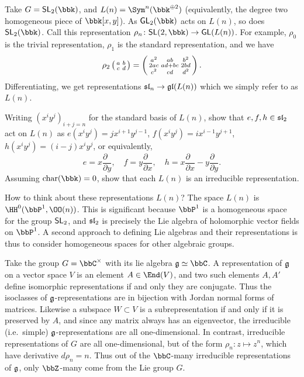 \begin{example}
    Take $G=\sf{SL}_2(\bbk)$, and $L(n)=\Sym^n(\bbk^{\oplus 2})$ (equivalently,
    the degree two homogeneous piece of $\bbk[x,y]$). As $\sf{GL}_2(\bbk)$ acts
    on $L(n)$, so does $\sf{SL}_2(\bbk)$. Call this representation $\rho_n\colon
    \sf{SL}(2,\bbk)\to \sf{GL}(L(n))$. For example, $\rho_0$ is the trivial
    representation, $\rho_1$ is the standard representation, and we have \[\rho_2\mat{a&b \\
    c&d} = \mat{a^2 & ab & b^2 \\ 2ac & ad+bc & 2bd \\ c^2 & cd & d^2}.\]
    Differentiating, we get representations $\sl_n\to \gl(L(n))$ which we
    simply refer to as $L(n)$.
\end{example}

\begin{exercise}
    Writing $(x^iy^j)_{i+j=n}$ for the standard basis of $L(n)$, show that
    $e,f,h\in \sl_2$ act on $L(n)$ as $e (x^iy^j) = jx^{i+1}y^{j-1}$, $f (x^iy^j) = ix^{i-1}y^{j+1}$,
    $h (x^iy^j) = (i-j)x^iy^j$, or equivalently,
    \begin{equation}
        e=x\frac{\partial\phantom{y}}{\partial y}, \quad f = y
        \frac{\partial\phantom{x}}{\partial x}, \quad h =
        x\frac{\partial\phantom{x}}{\partial x} - y
        \frac{\partial\phantom{y}}{\partial y}.\tag{$\ast$}\label{eqn:efh-diffop}
    \end{equation}
    Assuming $\text{char}(\bbk)=0$, show that each $L(n)$ is an irreducible representation.
\end{exercise}

\begin{remark} 
    How to think about these representations $L(n)$? The space $L(n)$ is
    $\HH^0(\bbP^1, \OO(n))$. This is significant because $\bbP^1$ is a
    homogeneous space for the group $\sf{SL}_2$, and $\sl_2$ is precisely the
    Lie algebra of holomorphic vector fields on $\bbP^1$. A second approach to
    defining Lie algebras and their representations is thus to consider
    homogeneous spaces for other algebraic groups.
\end{remark}

\begin{example}
    Take the group $G=\bbC^\times$ with its lie algebra $\frakg\simeq \bbC$. A
    representation of $\frakg$ on a vector space $V$ is an element $A\in \End(V)$,
    and two such elements $A,A'$ define isomorphic representations if and only
    they are conjugate. Thus the isoclasses of $\frakg$-representations are in
    bijection with Jordan normal forms of matrices. Likewise a subspace
    $W\subset V$ is a subrepresentation if and only if it is preserved by $A$,
    and since any matrix always has an eigenvector, the irreducible (i.e.\ simple)
    $\frakg$-representations are all one-dimensional. In contrast, irreducible
    representations of $G$ are all one-dimensional, but of the form
    $\rho_n\colon z\mapsto z^n$, which have derivative $d\rho_n = n$. Thus out
    of the $\bbC$-many irreducible representations of $\frakg$, only $\bbZ$-many
    come from the Lie group $G$.
\end{example}


